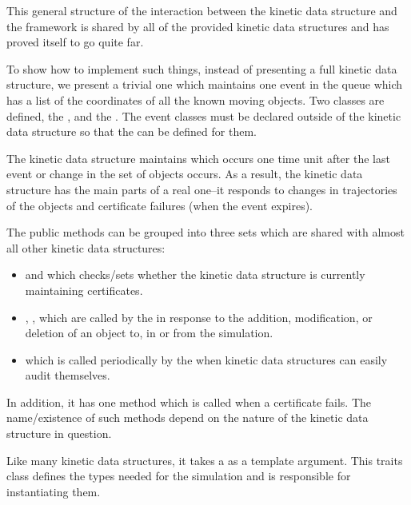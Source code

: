 This general structure of the interaction between the kinetic data
structure and the framework is shared by all of the provided kinetic
data structures and has proved itself to go quite far.

To show how to implement such things, instead of presenting a full
kinetic data structure, we present a trivial one which maintains one
event in the queue which has a list of the coordinates of all the
known moving objects.  Two classes are defined, the
, and the
. The event classes must be declared outside of the
kinetic data structure so that the  can be defined for
them. 

The kinetic data structure maintains which occurs one time unit after
the last event or change in the set of objects occurs. As a result,
the kinetic data structure has the main parts of a real one--it
responds to changes in trajectories of the objects and certificate
failures (when the event expires).

 The public methods can be grouped into three sets which are shared
 with almost all other kinetic data structures:
\begin{itemize}
\item {} and  which
  checks/sets whether the kinetic data structure is currently
  maintaining certificates.
\item {}, ,  which are called by the
   in response to the
  addition, modification, or deletion of an object to, in or from the
  simulation.
\item {} which is called periodically by the
   when kinetic data structures can
  easily audit themselves.
\end{itemize} 

In addition, it has one method which is called when a certificate
fails. The name/existence of such methods depend on the nature of the
kinetic data structure in question.

Like many kinetic data structures, it takes a 
as a template argument. This traits class defines the types needed for
the simulation and is responsible for instantiating them.

 \label{fig:trivial_usage_program}

